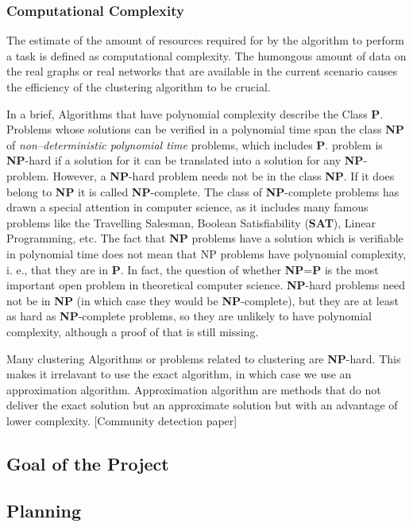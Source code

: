\subsubsection{Computational Complexity}
 The estimate of the amount of resources required for by the algorithm to perform a task is defined as computational complexity. The humongous amount of data on the real graphs or real networks that are available in the current scenario causes the efficiency of the clustering algorithm to be crucial.
\par In a brief, Algorithms that have polynomial complexity describe the Class \textbf{P}. Problems whose solutions can be verified in a polynomial time span the class \textbf{NP} of \textit{non--deterministic polynomial time} problems, which includes \textbf{P}. problem is \textbf{NP}-hard if a solution for it can be
translated into a solution for any \textbf{NP}-problem. However,
a \textbf{NP}-hard problem needs not be in the class \textbf{NP}. If it
does belong to \textbf{NP} it is called \textbf{NP}-complete. The class
of \textbf{NP}-complete problems has drawn a special attention
in computer science, as it includes many famous problems like the Travelling Salesman, Boolean Satisfiability
(\textbf{SAT}), Linear Programming, etc.
The fact that \textbf{NP} problems have a solution which is verifiable in polynomial
time does not mean that NP problems have polynomial
complexity, i. e., that they are in \textbf{P}. In fact, the question of whether \textbf{NP}=\textbf{P} is the most important open problem in theoretical computer science. \textbf{NP}-hard problems
need not be in \textbf{NP} (in which case they would be \textbf{NP}-complete), but they are at least as hard as \textbf{NP}-complete
problems, so they are unlikely to have polynomial complexity, although a proof of that is still missing.
\par Many clustering Algorithms or problems related to clustering are \textbf{NP}-hard. This makes it irrelavant to use the exact algorithm, in which case we use an approximation algorithm. Approximation algorithm are methods that do not deliver the exact solution but an approximate solution but with an advantage of lower complexity. [Community detection paper]

\subsection{Goal of the Project}

\subsection{Planning}
